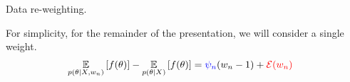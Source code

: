 \begin{frame}[t]{Data re-weighting.}
\pause


\pause


For simplicity, for the remainder of the presentation, we will
consider a single weight.
%
\begin{align*}
%
\expect{p(\theta \vert \xvec, \w_n)}{f(\theta)} -
    \expect{p(\theta \vert \xvec)}{f(\theta)} ={}&
    \blue{\infl_n} (\w_n - 1) + \red{\err(\w_n)}
%
\end{align*}
%

\end{frame}





    


